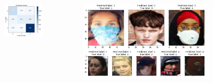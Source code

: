 \documentclass[aspectratio=1610, 9pt]{beamer}
\begin{document}
\begin{frame}
  \begin{columns}
    \begin{column}{0.3 \textwidth }
      \begin{figure}
        \centering
        \includegraphics[width = 0.8\textwidth]{images/Matrix.png}
      \end{figure}
    \end{column}
    \begin{column}{0.7 \textwidth }
      \centering
      \includegraphics[width = 0.8\textwidth]{images/Bilder.png}
    \end{column}
  \end{columns}
\end{frame}
\end{document}

